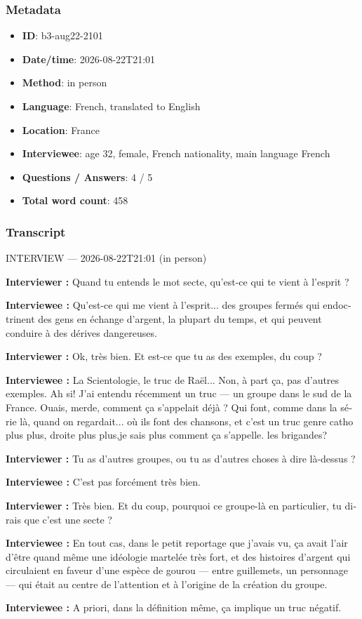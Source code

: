 \subsubsection*{Metadata}
\begin{itemize}
  \item \textbf{ID}: b3-aug22-2101
  \item \textbf{Date/time}: 2026-08-22T21:01
  \item \textbf{Method}: in person
  \item \textbf{Language}: French, translated to English
  \item \textbf{Location}: France
  \item \textbf{Interviewee}: age 32, female, French nationality, main language French
  \item \textbf{Questions / Answers}: 4 / 5
  \item \textbf{Total word count}: 458
\end{itemize}
\subsubsection*{Transcript}
\begin{otherlanguage}{french}
INTERVIEW — 2026-08-22T21:01 (in person)

\textbf{Interviewer :} Quand tu entends le mot secte, qu'est-ce qui te vient à l'esprit ?

\textbf{Interviewee :} Qu'est-ce qui me vient à l'esprit... des groupes fermés qui endoctrinent des gens en échange d'argent, la plupart du temps, et qui peuvent conduire à des dérives dangereuses.

\textbf{Interviewer :} Ok, très bien. Et est-ce que tu as des exemples, du coup ?

\textbf{Interviewee :} La Scientologie, le truc de Raël... Non, à part ça, pas d'autres exemples. Ah si! J'ai entendu récemment un truc — un groupe dans le sud de la France. Ouais, merde, comment ça s'appelait déjà ? Qui font, comme  dans la série là, quand on regardait... où ils font des chansons, et c'est un truc genre catho plus plus, droite plus plus,je sais plus comment ça s'appelle. les brigandes?

\textbf{Interviewer :} Tu as d'autres groupes, ou tu as d'autres choses à dire là-dessus ?

\textbf{Interviewee :} C'est pas forcément très bien.

\textbf{Interviewer :} Très bien. Et du coup, pourquoi ce groupe-là en particulier, tu dirais que c'est une secte ?

\textbf{Interviewee :} En tout cas, dans le petit reportage que j'avais vu, ça avait l'air d'être quand même une idéologie martelée très fort, et des histoires d'argent qui circulaient en faveur d'une espèce de gourou — entre guillemets, un personnage — qui était au centre de l'attention et à l'origine de la création du groupe.

\textbf{Interviewee :} A priori, dans la définition même, ça implique un truc négatif.
\end{otherlanguage}
